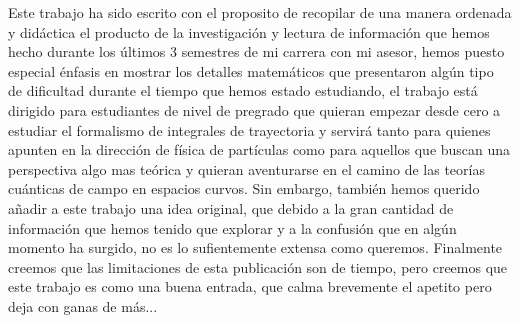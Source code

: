Este trabajo ha sido escrito con el proposito de recopilar de una manera ordenada y didáctica el producto de la investigación y lectura de información que hemos hecho durante los últimos 3 semestres de mi carrera con mi asesor, hemos puesto especial énfasis en mostrar los detalles matemáticos que presentaron algún tipo de dificultad durante el tiempo que hemos estado estudiando, el trabajo está dirigido para estudiantes de nivel de pregrado que quieran empezar desde cero a estudiar el formalismo de integrales de trayectoria y servirá tanto para quienes apunten en la dirección de física de partículas como para aquellos que buscan una perspectiva algo mas teórica y quieran aventurarse en el camino de las teorías cuánticas de campo en espacios curvos. Sin embargo, también hemos querido añadir a este trabajo una idea original, que debido a la gran cantidad de información que hemos tenido que explorar y a la confusión que en algún momento ha surgido, no es lo sufientemente extensa como queremos. Finalmente creemos que las limitaciones de esta publicación son de tiempo, pero creemos que este trabajo es como una buena entrada, que calma brevemente el apetito pero deja con ganas de más...